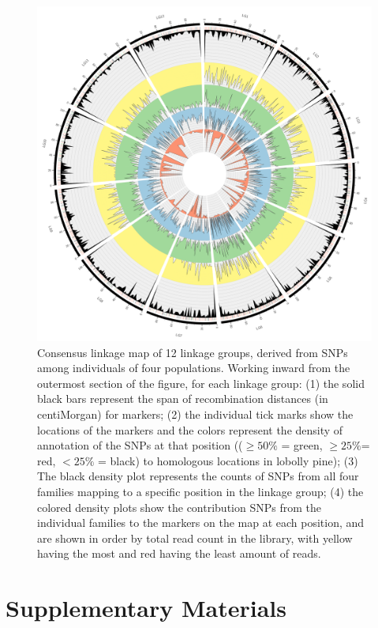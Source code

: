 \documentclass[smallextended]{svjour3}
\newcommand{\beginsupplement}{%
        \setcounter{table}{0}
        \renewcommand{\thetable}{S\arabic{table}}
        \setcounter{figure}{0}
        \renewcommand{\thefigure}{S\arabic{figure}}
        \renewcommand{\thesection}{S\arabic{section}}
        \renewcommand{\thesubsection}{S\arabic{subsection}} 
     }
\begin{document}
\clearpage

\begin{figure}[ht]
  \centering
  \includegraphics[width=\textwidth]{circos_con}
  \caption{Consensus linkage map of 12 linkage groups, derived from SNPs among
    individuals of four populations.  Working inward from the outermost section
    of the figure, for each linkage group: (1) the solid black bars represent
    the span of recombination distances (in centiMorgan) for markers; (2) the
    individual tick marks show the locations of the markers and the colors
    represent the density of annotation of the SNPs at that position (($\ge
    50\%$ = green, $\ge 25\%$= red, $< 25\%$ = black) to homologous locations in
    lobolly pine); (3) The black density plot represents the counts of SNPs from
    all four families mapping to a specific position in the linkage group; (4)
    the colored density plots show the contribution SNPs from the individual
    families to the markers on the map at each position, and are shown in order
    by total read count in the library, with yellow having the most and red
    having the least amount of reads.}
  \label{f:con}
\end{figure}

\clearpage

\beginsupplement

\section*{Supplementary Materials}
\end{document}
